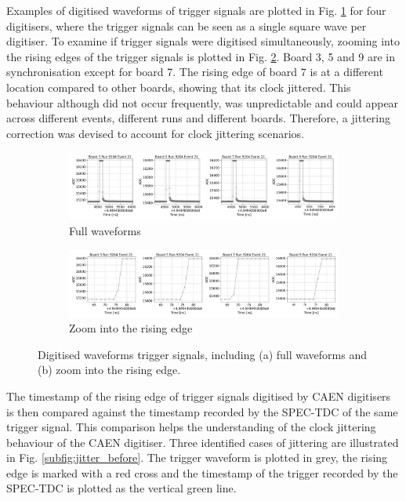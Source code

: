 Examples of digitised waveforms of trigger signals are plotted in Fig. \ref{fig:full_wfm} for four digitisers, where the trigger signals can be seen as a single square wave per digitiser.
To examine if trigger signals were digitised simultaneously, zooming into the rising edges of the trigger signals is plotted in Fig. \ref{fig:zoom_edge}.
Board 3, 5 and 9 are in synchronisation except for board 7.
The rising edge of board 7 is at a different location compared to other boards, showing that its clock jittered.
This behaviour although did not occur frequently, was unpredictable and could appear across different events, different runs and different boards. 
Therefore, a jittering correction was devised to account for clock jittering scenarios.

\begin{figure}[ht!]
\begin{subfigure}[h]{1.00\linewidth}
\centering    
\includegraphics[width=\linewidth]{jitter_before_unzoom}
\caption{Full waveforms}
\label{fig:full_wfm}
\end{subfigure}
\vspace{0.5cm}
\begin{subfigure}[h]{1.00\linewidth}
\centering    
\includegraphics[width=\linewidth]{jitter_before_zoom}
\caption{Zoom into the rising edge}
\label{fig:zoom_edge}
\end{subfigure}%

\caption[Clock Jitterin Cases]{
Digitised waveforms trigger signals, including (a) full waveforms and (b) zoom into the rising edge.
}
\label{fig:trig_wfm}
\end{figure}


The timestamp of the rising edge of trigger signals digitised by CAEN digitisers is then compared against the timestamp recorded by the SPEC-TDC of the same trigger signal.
This comparison helps the understanding of the clock jittering behaviour of the CAEN digitiser. 
Three identified cases of jittering are illustrated in Fig. \ref{subfig:jitter_before}.
The trigger waveform is plotted in grey, the rising edge is marked with a red cross and the timestamp of the trigger recorded by the SPEC-TDC is plotted as the vertical green line.

